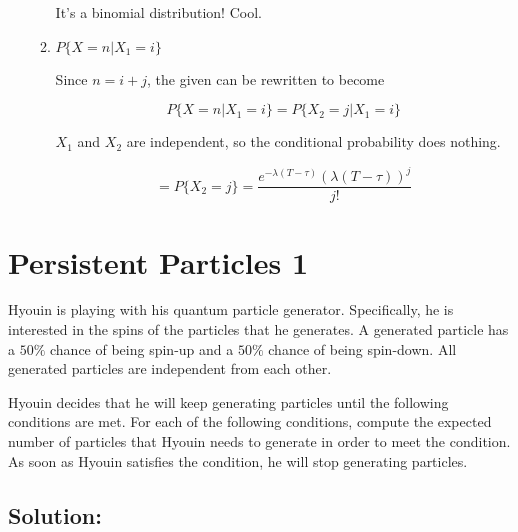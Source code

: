 \documentclass{article}
\begin{document}
\begin{enumerate}[label=(\alph*)]
\begin{enumerate}[label=(\roman*)]
        It's a binomial distribution! Cool.
        
        \item \textbf{$P\{X = n \vert X_1 = i\}$}

        Since $n = i + j$, the given can be rewritten to become 

        $$P\{X = n \vert X_1 = i\} = P\{X_2 = j \vert X_1 = i\}$$
        
        $X_1$ and $X_2$ are independent, so the conditional probability does nothing.

        $$= P\{X_2 = j\} = \boxed{\frac{e^{-\lambda (T - \tau)}(\lambda (T - \tau))^j}{j!}}$$
    \end{enumerate}
\end{enumerate}

\newpage

\section{Persistent Particles 1}

Hyouin is playing with his quantum particle generator. Specifically, he is interested in the spins of the particles that he generates. A generated particle has a $50\%$ chance of being spin-up and a $50\%$ chance of being spin-down. All generated particles are independent from each other.

Hyouin decides that he will keep generating particles until the following conditions are met. For each of the following conditions, compute the expected number of particles that Hyouin needs to generate in order to meet the condition. As soon as Hyouin satisfies the condition, he will stop generating particles.

\subsection{Solution:}
\end{document}
